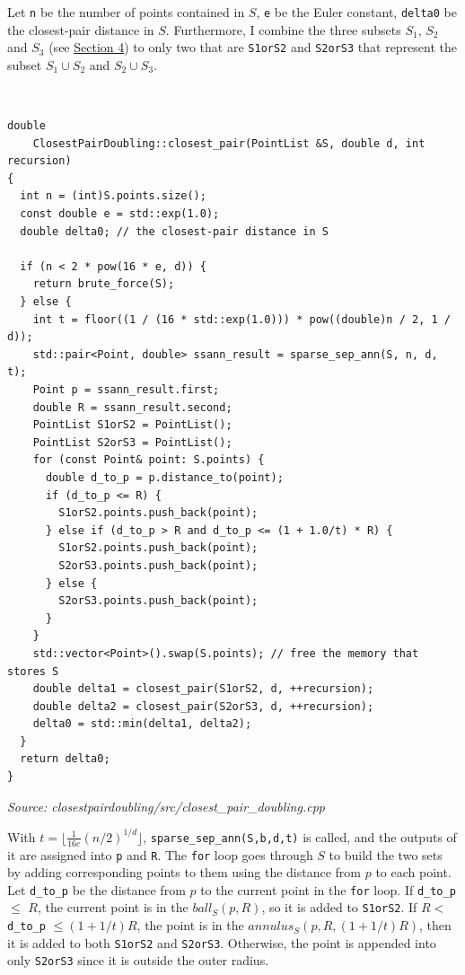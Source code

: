 \documentclass[12pt,english,]{article}
\newcommand{\code}[1]{\colorbox{light-gray}{\texttt{#1}}}
\begin{document}
Let \code{n} be the number of points contained in \(S\), \code{e} be the
Euler constant, \code{delta0} be the closest-pair distance in \(S\).
Furthermore, I combine the three subsets \(S_1\), \(S_2\) and \(S_3\)
(see \protect\hyperlink{section4}{Section 4}) to only two that are
\code{S1orS2} and \code{S2orS3} that represent the subset
\(S_1 \cup S_2\) and \(S_2 \cup S_3\).

~

\begin{lstlisting}
double
    ClosestPairDoubling::closest_pair(PointList &S, double d, int recursion)
{
  int n = (int)S.points.size();
  const double e = std::exp(1.0);
  double delta0; // the closest-pair distance in S

  if (n < 2 * pow(16 * e, d)) {
    return brute_force(S);
  } else {
    int t = floor((1 / (16 * std::exp(1.0))) * pow((double)n / 2, 1 / d));
    std::pair<Point, double> ssann_result = sparse_sep_ann(S, n, d, t);
    Point p = ssann_result.first;
    double R = ssann_result.second;
    PointList S1orS2 = PointList();
    PointList S2orS3 = PointList();
    for (const Point& point: S.points) {
      double d_to_p = p.distance_to(point);
      if (d_to_p <= R) {
        S1orS2.points.push_back(point);
      } else if (d_to_p > R and d_to_p <= (1 + 1.0/t) * R) {
        S1orS2.points.push_back(point);
        S2orS3.points.push_back(point);
      } else {
        S2orS3.points.push_back(point);
      }
    }
    std::vector<Point>().swap(S.points); // free the memory that stores S
    double delta1 = closest_pair(S1orS2, d, ++recursion);
    double delta2 = closest_pair(S2orS3, d, ++recursion);
    delta0 = std::min(delta1, delta2);
  }
  return delta0;
}
\end{lstlisting}
\vspace{-9truemm}
\begin{minipage}{1\textwidth}
  \begin{flushright}
  {\footnotesize \emph{Source: closestpairdoubling/src/closest\_pair\_doubling.cpp}\par}
  \end{flushright}
\end{minipage}
\vspace{0.5truemm}

With \(t = \lfloor \frac{1}{16e}(n/2)^{1/d}\rfloor\),
\code{sparse\_sep\_ann(S,b,d,t)} is called, and the outputs of it are
assigned into \code{p} and \code{R}. The \code{for} loop goes through
\(S\) to build the two sets by adding corresponding points to them using
the distance from \(p\) to each point. Let \code{d\_to\_p} be the
distance from \(p\) to the current point in the \code{for} loop. If
\code{d\_to\_p} \(\leq\) \(R\), the current point is in the
\(ball_S(p, R)\), so it is added to \code{S1orS2}. If \(R <\)
\code{d\_to\_p} \(\leq (1 + 1/t)R\), the point is in the
\(annulus_S(p, R, (1+1/t)R)\), then it is added to both \code{S1orS2}
and \code{S2orS3}. Otherwise, the point is appended into only
\code{S2orS3} since it is outside the outer radius.
\end{document}
